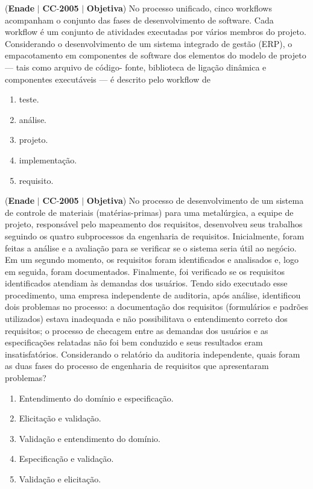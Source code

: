 \documentclass{exam}
\begin{document}
\begin{questions}
\question (\textbf{Enade} $|$ \textbf{CC}-\textbf{2005} $|$ \textbf{Objetiva})
No processo unificado, cinco workflows acompanham o conjunto
das fases de desenvolvimento de software. Cada workflow é um
conjunto de atividades executadas por vários membros do projeto.
Considerando o desenvolvimento de um sistema integrado de
gestão (ERP), o empacotamento em componentes de software dos
elementos do modelo de projeto — tais como arquivo de código-
fonte, biblioteca de ligação dinâmica e componentes executáveis
— é descrito pelo workflow de
	\begin{enumerate}[label=\alph*)]
		\item  teste.
		\item  análise.
		\item  projeto.
		\item  implementação.
		\item  requisito.
	\end{enumerate}

\question (\textbf{Enade} $|$ \textbf{CC}-\textbf{2005} $|$ \textbf{Objetiva})
No processo de desenvolvimento de um sistema de
controle de materiais (matérias-primas) para uma
metalúrgica, a equipe de projeto, responsável pelo
mapeamento dos requisitos, desenvolveu seus trabalhos
seguindo os quatro subprocessos da engenharia de
requisitos. Inicialmente, foram feitas a análise e a avaliação
para se verificar se o sistema seria útil ao negócio. Em um
segundo momento, os requisitos foram identificados e
analisados e, logo em seguida, foram documentados.
Finalmente, foi verificado se os requisitos identificados
atendiam às demandas dos usuários. Tendo sido executado
esse procedimento, uma empresa independente de
auditoria, após análise, identificou dois problemas no
processo: a documentação dos requisitos (formulários e
padrões utilizados) estava inadequada e não possibilitava
o entendimento correto dos requisitos; o processo de
checagem entre as demandas dos usuários e as
especificações relatadas não foi bem conduzido e seus
resultados eram insatisfatórios.
Considerando o relatório da auditoria independente, quais foram
as duas fases do processo de engenharia de requisitos que
apresentaram problemas?
	\begin{enumerate}[label=\alph*)]
		\item  Entendimento do domínio e especificação.
		\item  Elicitação e validação.
		\item  Validação e entendimento do domínio.
		\item  Especificação e validação.
		\item  Validação e elicitação.
	\end{enumerate}


\end{questions}
\end{document}
